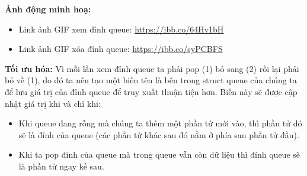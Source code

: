 \documentclass[main.tex]{subfiles}
\begin{document}
\textbf{Ảnh động minh hoạ:}
\begin{itemize}
    \item Link ảnh GIF xem đỉnh queue: \href{https://ibb.co/64Hv1bH}{https://ibb.co/64Hv1bH}
    \item Link ảnh GIF xóa đỉnh queue: \href{https://ibb.co/syPCBFS}{https://ibb.co/syPCBFS}
\end{itemize}

\textbf{ Tối ưu hóa:}
Vì mỗi lần xem đỉnh queue ta phải pop (1) bỏ sang (2) rồi lại phải bỏ về (1), do đó ta nên tạo một biến tên là  bên trong struct queue của chúng ta để lưu giá trị của đỉnh queue để truy xuất thuận tiện hơn. Biến này sẽ được cập nhật giá trị khi và chỉ khi:
\begin{itemize}
    \item Khi queue đang rỗng mà chúng ta thêm một phần tử mới vào, thì phần tử đó sẽ là đỉnh của queue (các phần tử khác sau đó nằm ở phía sau phần tử đầu).
    \item Khi ta pop đỉnh của queue mà trong queue vẫn còn dữ liệu thì đỉnh queue sẽ là phần tử ngay kế sau.
\end{itemize}
\end{document}
